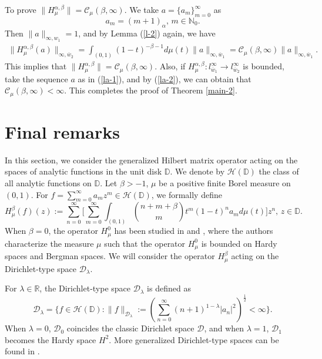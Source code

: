 \documentclass[10pt]{amsart}
\theoremstyle{definition}
\theoremstyle{question}
\numberwithin{equation}{section}
\begin{document}
To prove $\|H_{\mu}^{\alpha, \beta}\|=\mathcal{C}_{\mu}(\beta, \infty).$ We take $a=\{a_m\}_{m=0}^{\infty}$ as
\begin{equation}\label{la-1}a_m=(m+1)_{\alpha},\, m\in \mathbb{N}_0.\end{equation}
Then $\|a\|_{\infty, w_1}=1$, and by Lemma (\ref{l-2}) again, we have
\begin{eqnarray}\label{la-2}
\|H_{\mu}^{\alpha, \beta}(a)\|_{\infty, \overline{w}_2}=\int_{(0,1)}(1-t)^{-\beta-1}d\mu(t) \|a\|_{\infty, \overline{w}_1}=\mathcal{C}_{\mu}(\beta, \infty) \|a\|_{\infty, \overline{w}_1}. 
\end{eqnarray}
This implies that $\|H_{\mu}^{\alpha, \beta}\|=\mathcal{C}_{\mu}(\beta, \infty).$ Also, if $H_{\mu}^{\alpha, \beta}: l_{\overline{w}_1}^{\infty}\rightarrow l_{\overline{w}_2}^{\infty}$ is bounded, take the sequence $a$
as in (\ref{la-1}), and by (\ref{la-2}), we can obtain that $\mathcal{C}_{\mu}(\beta, \infty)<\infty$. This completes the proof of Theorem \ref{main-2}.

\section{{\bf Final remarks}}
In this section, we consider the generalized Hilbert matrix operator acting on the spaces of analytic functions in the unit disk $\mathbb{D}$.   
We denote by $\mathcal{H}(\mathbb{D})$ the class of all analytic functions on $\mathbb{D}$. 
Let $\beta>-1$, $\mu$ be a positive finite Borel measure on $(0,1)$.  For $f=\sum_{m=0}^{\infty}a_mz^m \in  \mathcal{H}(\mathbb{D})$, we formally define 
$$H_{\mu}^{\beta}(f)(z):=\sum_{n=0}^{\infty}\Big[\sum\limits_{m=0}^{\infty}\int_{(0,1)}\binom{n+m+\beta}{m}t^m (1-t)^{n}a_md\mu(t)\Big]z^n,\, z\in \mathbb{D}.$$
When $\beta=0$, the operator $H_{\mu}^{0}$ has been studied in \cite{bcds} and \cite{bd}, where the authors characterize the measure $\mu$ such that the operator $H_{\mu}^{0}$ is bounded on Hardy spaces and Bergman spaces. We will consider the operator $H_{\mu}^{\beta}$ acting on the Dirichlet-type space $\mathcal{D}_{\lambda}$. 
 
For $\lambda\in \mathbb{R}$, the Dirichlet-type space $\mathcal{D}_{\lambda}$ is defined as
\begin{equation*}
\mathcal{D}_{\lambda}=\{f\in \mathcal{H}(\mathbb{D}): \|f\|_{\mathcal{D}_{\lambda}}:=(\sum_{n=0}^{\infty}(n+1)^{1-\lambda} |a_{n}|^2)^{\frac{1}{2}}<\infty\}.\end{equation*}
When $\lambda=0$,  $\mathcal{D}_0$ coincides the classic Dirichlet space $\mathcal{D}$, and when $\lambda=1$, $\mathcal{D}_1$ becomes the Hardy space $H^2$. More generalized Dirichlet-type spaces can be found in \cite{osca}.
 
\end{document}
